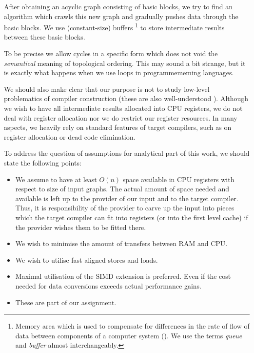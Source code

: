 
  After obtaining an acyclic graph consisting of basic blocks, we try to find an algorithm which crawls this new graph and gradually pushes data through the basic blocks. We use (constant-size) buffers \footnote{Memory area which is used to compensate for differences in the rate of flow of data between components of a computer system (\cite{thesarus}). We use the terms \emph{queue} and \emph{buffer} almost interchangeably.} to store intermediate results between these basic blocks.


\begin{rem}
  To be precise we allow cycles in a specific form which does not void the \emph{semantical} meaning of topological ordering. This may sound a bit strange, but it is exactly what happens when we use loops in programmememing languages.
\end{rem}

  We should also make clear that our purpose is not to study low-level problematics of compiler construction (these are also well-understood \cite{compiler_theory}). Although we wish to have all intermediate results allocated into CPU registers, we do not deal with register allocation nor we do restrict our register resources. In many aspects, we heavily rely on standard features of target compilers, such as on register allocation or dead code elimination.

To address the question of assumptions for analytical part of this work, we should state the following points:
\begin{itemize}
  \item We assume to have at least $O(n)$ space available in CPU registers with respect to size of input graphs. The actual amount of space needed and available is left up to the provider of our input and to the target compiler. Thus, it is responsibility of the provider to carve up the input into pieces which the target compiler can fit into registers (or into the first level cache) if the provider wishes them to be fitted there.
  \item We wish to minimise the amount of transfers between RAM and CPU.
  \item We wish to utilise fast aligned stores and loads.
  \item Maximal utilisation of the SIMD extension is preferred. Even if the cost needed for data conversions exceeds actual performance gains.
  \item These are part of our assignment.
\end{itemize}


